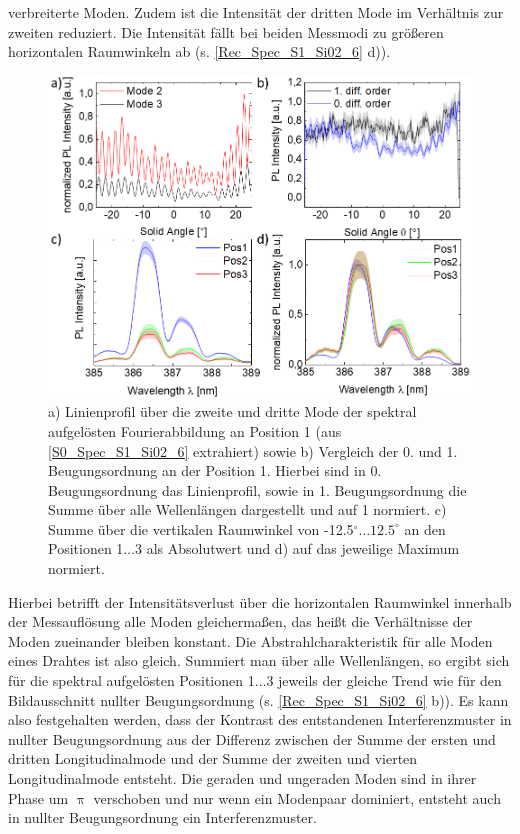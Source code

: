 verbreiterte Moden. Zudem ist die Intensität der dritten Mode im Verhältnis zur
zweiten reduziert. Die Intensität fällt bei beiden Messmodi zu größeren
horizontalen Raumwinkeln ab (s. \autoref{Rec_Spec_S1_Si02_6}
d)).\begin{figure}[h]
\includegraphics[width=.6\textwidth]{Bilder/SiO2/Rec_Spec_S1_Si02_6} \caption{a)
Linienprofil über die zweite und dritte Mode der spektral aufgelösten
Fourierabbildung an Position 1 (aus \autoref{S0_Spec_S1_Si02_6} extrahiert)
sowie b) Vergleich der 0. und 1. Beugungsordnung an der Position 1. Hierbei sind
in 0. Beugungsordnung das Linienprofil, sowie in 1. Beugungsordnung die Summe
über alle Wellenlängen dargestellt und auf 1 normiert. c) Summe über die
vertikalen Raumwinkel von -12.5$^\circ \ldots \text{12.5}^\circ$ an den
Positionen 1$\ldots$3 als Absolutwert und d) auf das jeweilige Maximum
normiert.} \label{Rec_Spec_S1_Si02_6} \end{figure}Hierbei betrifft der
Intensitätsverlust über die horizontalen Raumwinkel innerhalb der Messauflösung
alle Moden gleichermaßen, das heißt die Verhältnisse der Moden zueinander
bleiben konstant. Die Abstrahlcharakteristik für alle Moden eines Drahtes ist
also gleich. Summiert man über alle Wellenlängen, so ergibt sich für die
spektral aufgelösten Positionen 1$\ldots$3 jeweils der gleiche Trend wie für den
Bildausschnitt nullter Beugungsordnung (s. \autoref{Rec_Spec_S1_Si02_6} b)). Es
kann also festgehalten werden, dass der Kontrast des entstandenen
Interferenzmuster in nullter Beugungsordnung aus der Differenz zwischen der
Summe der ersten und dritten Longitudinalmode und der Summe der zweiten und
vierten Longitudinalmode entsteht. Die geraden und ungeraden Moden sind in ihrer
Phase um $\uppi$ verschoben und nur wenn ein Modenpaar dominiert, entsteht auch
in nullter Beugungsordnung ein Interferenzmuster.
